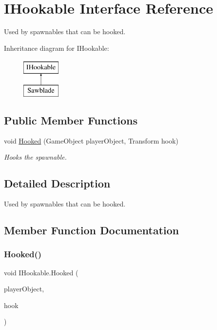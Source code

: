 \hypertarget{interface_i_hookable}{}\section{I\+Hookable Interface Reference}
\label{interface_i_hookable}


Used by spawnables that can be hooked.  


Inheritance diagram for I\+Hookable\+:\begin{figure}[H]
\begin{center}
\leavevmode
\includegraphics[height=2.000000cm]{interface_i_hookable}
\end{center}
\end{figure}
\subsection*{Public Member Functions}
\begin{DoxyCompactItemize}
\item 
void \hyperlink{interface_i_hookable_a81d9592915b1eb00f87ebc27adc9419e}{Hooked} (Game\+Object player\+Object, Transform hook)
\begin{DoxyCompactList}\small\item\em Hooks the spawnable. \end{DoxyCompactList}\end{DoxyCompactItemize}


\subsection{Detailed Description}
Used by spawnables that can be hooked. 



\subsection{Member Function Documentation}
\hypertarget{interface_i_hookable_a81d9592915b1eb00f87ebc27adc9419e}{}\label{interface_i_hookable_a81d9592915b1eb00f87ebc27adc9419e} 
\subsubsection{\texorpdfstring{Hooked()}{Hooked()}}
{\footnotesize\ttfamily void I\+Hookable.\+Hooked (\begin{DoxyParamCaption}\item[{Game\+Object}]{player\+Object,  }\item[{Transform}]{hook }\end{DoxyParamCaption})}



